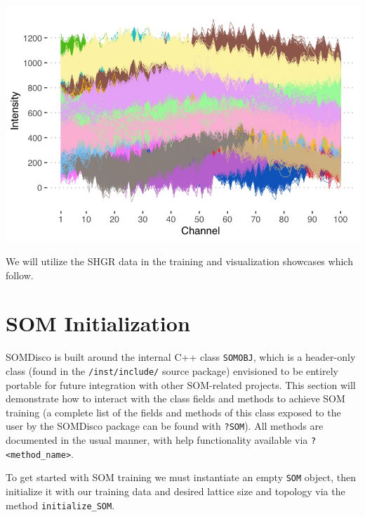 \documentclass[]{article}
\begin{document}
\begin{center}\includegraphics[width=0.7\linewidth]{./figs/SGRW-100d_20class_cov500-4000-spectra} \end{center}

We will utilize the SHGR data in the training and visualization showcases which follow.

\hypertarget{som-initialization}{%
\section{SOM Initialization}\label{som-initialization}}

SOMDisco is built around the internal C++ class \texttt{SOMOBJ}, which is a header-only class (found in the \texttt{/inst/include/} source package) envisioned to be entirely portable for future integration with other SOM-related projects. This section will demonstrate how to interact with the class fields and methods to achieve SOM training (a complete list of the fields and methods of this class exposed to the user by the SOMDisco package can be found with \texttt{?SOM}). All methods are documented in the usual manner, with help functionality available via \texttt{?\textless{}method\_name\textgreater{}}.

To get started with SOM training we must instantiate an empty \texttt{SOM} object, then initialize it with our training data and desired lattice size and topology via the method \texttt{initialize\_SOM}.
\end{document}
